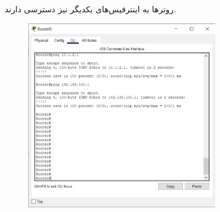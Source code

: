 \documentclass{article}
\begin{document}
\section{}%
روترها به اینترفیس‌های  یکدیگر نیز دسترسی دارند.
\begin{figure}[H]
    \centering
    \includegraphics[width=0.75\textwidth]{figures/14.jpg}
    \caption{}
    \label{fig:fig1}
\end{figure}
\end{document}
